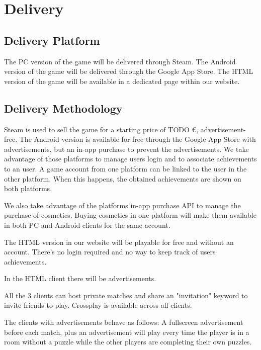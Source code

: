\section{Delivery}

\subsection{Delivery Platform}
The PC      version of the game will be delivered through Steam. 
The Android version of the game will be delivered through the Google App Store.
The HTML    version of the game will be available in a dedicated page within our website.

\subsection{Delivery Methodology}
Steam is used to sell the game for a starting price of TODO €, advertisement-free.
The Android version is available for free through the Google App Store with advertisements, but an in-app purchase to prevent the advertisements.
We take advantage of those platforms to manage users login and to associate achievements to an user. A game account from one platform can be linked to the user in the other platform. When this happens, the obtained achievements are shown on both platforms. 


We also take advantage of the platforms in-app purchase API to manage the purchase of cosmetics. Buying cosmetics in one platform will make them available in both PC and Android clients for the same account.

The HTML version in our website will be playable for free and without an account. 
There's no login required and no way to keep track of users achievements.

In the HTML client there will be advertisements.

All the 3 clients can host private matches and share an "invitation" keyword to invite friends to play. Crossplay is available across all clients.

The clients with advertisements behave as follows:
A fullscreen advertisement before each match, plus an advertisement will play every time the player is in a room without a puzzle while the other players are completing their own puzzles.

\pagebreak 
